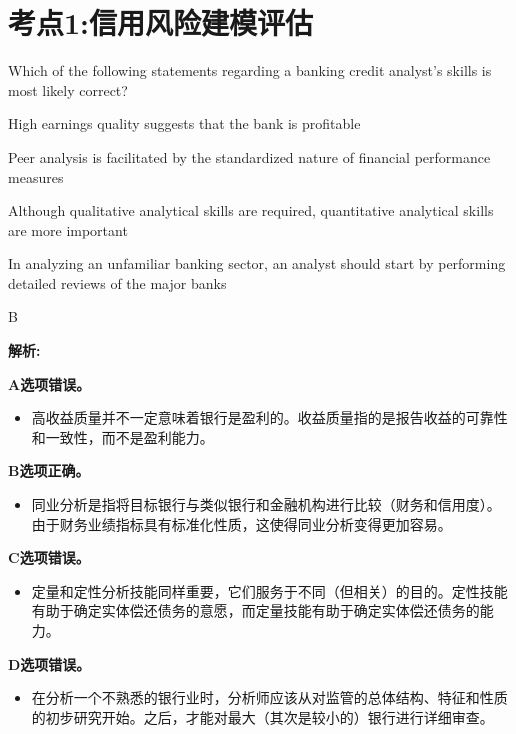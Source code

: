 \documentclass{article}
\newcounter{question} %
\newenvironment{explanation}
{\textbf{解析:}\par}
{\par}
\begin{document}
 \tableofcontents %
\newpage




\section{考点1:信用风险建模评估}
\setcounter{question}{0}

\begin{question}
    Which of the following statements regarding a banking credit analyst's skills is most likely correct?
\end{question}

\begin{choices}
    \item High earnings quality suggests that the bank is profitable
    \item Peer analysis is facilitated by the standardized nature of financial performance measures
    \item Although qualitative analytical skills are required, quantitative analytical skills are more important
    \item In analyzing an unfamiliar banking sector, an analyst should start by performing detailed reviews of the major banks
\end{choices}

\begin{correctanswer}
    B
\end{correctanswer}

\begin{explanation}
    \textbf{A选项错误。}
    \begin{itemize}
        \item 高收益质量并不一定意味着银行是盈利的。收益质量指的是报告收益的可靠性和一致性，而不是盈利能力。
    \end{itemize}
    
    \textbf{B选项正确。}
    \begin{itemize}
        \item 同业分析是指将目标银行与类似银行和金融机构进行比较（财务和信用度）。由于财务业绩指标具有标准化性质，这使得同业分析变得更加容易。
    \end{itemize}
    
    \textbf{C选项错误。}
    \begin{itemize}
        \item 定量和定性分析技能同样重要，它们服务于不同（但相关）的目的。定性技能有助于确定实体偿还债务的意愿，而定量技能有助于确定实体偿还债务的能力。
    \end{itemize}
    
    \textbf{D选项错误。}
    \begin{itemize}
        \item 在分析一个不熟悉的银行业时，分析师应该从对监管的总体结构、特征和性质的初步研究开始。之后，才能对最大（其次是较小的）银行进行详细审查。
    \end{itemize}
\end{explanation}
\end{document}

